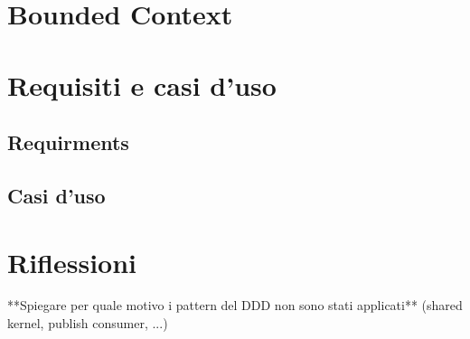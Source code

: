 \section{Bounded Context}
\section{Requisiti e casi d'uso}
\subsection{Requirments}
\subsection{Casi d'uso}
\section{Riflessioni}
**Spiegare per quale motivo i pattern del DDD non sono stati applicati**
(shared kernel, publish consumer, ...)
